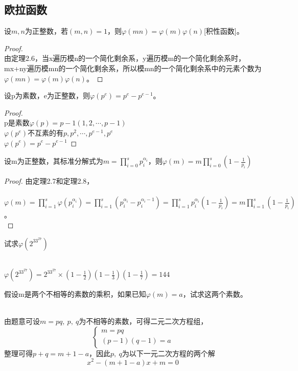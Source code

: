 \documentclass[cn,10pt]{elegantbook}
\begin{document}
\subsection{欧拉函数}
\begin{theorem}
  设$m,n$为正整数，若$(m,n)=1$，则$\varphi(mn) = \varphi(m) \varphi(n)$[积性函数]。
\end{theorem}
\begin{proof}
  \\由定理2.6，当x遍历模n的一个简化剩余系，y遍历模m的一个简化剩余系时，mx+ny遍历模mn的一个简化剩余系，所以模mn的一个简化剩余系中的元素个数为$\varphi(mn) = \varphi(m) \varphi (n)$。
\end{proof}
\begin{theorem}
  设p为素数，e为正整数，则$\varphi(p^e) = p^e-p^{e-1}$。
\end{theorem}
\begin{proof}
  \\p是素数$\varphi(p) = p-1(1,2,\cdots,p-1)$\\
  $\varphi(p^e)$不互素的有$p,p^2,\cdots,p^{e-1},p^e$\\
  $\varphi(p^e) = p^e-p^{e-1}$
\end{proof}
\begin{theorem}
  设m为正整数，其标准分解式为$m = \prod_{i=0}^s p_i^{\alpha_i}$，则$\varphi(m)=m\prod_{i=0}^s (1-\frac{1}{p_i})$
\end{theorem}
\begin{proof}
  由定理2.7和定理2.8，\\  \\
  $\varphi(m) = \prod_{i=1}^s\varphi(p_i^{\alpha_i}) = \prod_{i=1}^s(p_i^{\alpha_i}-p_i^{\alpha_i-1})=\prod_{i=1}^sp_i^{\alpha_i}(1-\frac{1}{p_i})=m\prod_{i=1}^s(1-\frac{1}{p_i})$。\\
\end{proof}
\begin{example}
  试求$\varphi(2^33^27)$
\end{example}
\begin{solution}
  \\
  $\varphi(2^33^27)=2^33^27 \times (1-\frac{1}{2})(1-\frac{1}{3})(1-\frac{1}{7})=144$\\
\end{solution}
\begin{example}
  假设m是两个不相等的素数的乘积，如果已知$\varphi(m)=a$，试求这两个素数。
\end{example}
\begin{solution}
  \\
  由题意可设$m = pq,\ p,\ q$为不相等的素数，可得二元二次方程组，
  \[
    \begin{cases}
      m = pq\\
      (p-1)(q-1) = a
    \end{cases}
  \]
    整理可得$p+q = m+1-a$，因此$p,\ q$为以下一元二次方程的两个解
    \begin{equation*}
      x^2-(m+1-a)x+m = 0
    \end{equation*}
\end{solution}
\end{document}
